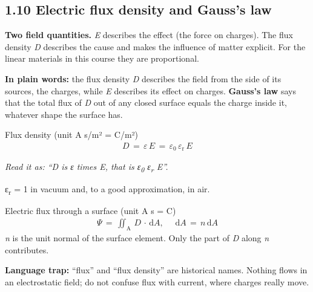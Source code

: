 \documentclass[11pt]{article}
\begin{document}
\begin{keepsection}
\section{1.10 Electric flux density and Gauss’s law}

\textbf{Two field quantities.} \textit{E} describes the effect (the force on charges). The flux density \textit{D} describes the cause and makes the influence of matter explicit. For the linear materials in this course they are proportional.

\begin{plainbox}\textbf{In plain words:} the flux density \textit{D} describes the field from the side of its sources, the charges, while \textit{E} describes its effect on charges. \textbf{Gauss’s law} says that the total flux of \textit{D} out of any closed surface equals the charge inside it, whatever shape the surface has.\end{plainbox}

\begin{equationcard}{Flux density (unit A s/m² = C/m²)}
\[ \begin{gathered} {D}\, =\, ε\, {E}\, =\, ε_{0}\, ε_{\mathrm{r}}\, {E} \end{gathered} \]
{\small \emph{Read it as: “D is ε times E, that is ε\textsubscript{0} ε\textsubscript{r} E”.}\par ε\textsubscript{r} = 1 in vacuum and, to a good approximation, in air.}
\end{equationcard}

\begin{equationcard}{Electric flux through a surface (unit A s = C)}
\[ \begin{gathered} Ψ\, =\, \iint_{\mathrm{A}} \, {D}\, \cdot \, \mathrm{d}{A},\, \quad \, \mathrm{d}{A}\, =\, {n}\, \mathrm{d}{A} \end{gathered} \]
{\small \textit{n} is the unit normal of the surface element. Only the part of \textit{D} along \textit{n} contributes.}
\end{equationcard}

\begin{notebox}\textbf{Language trap:} “flux” and “flux density” are historical names. Nothing flows in an electrostatic field; do not confuse flux with current, where charges really move.\end{notebox}


\end{keepsection}
\end{document}
